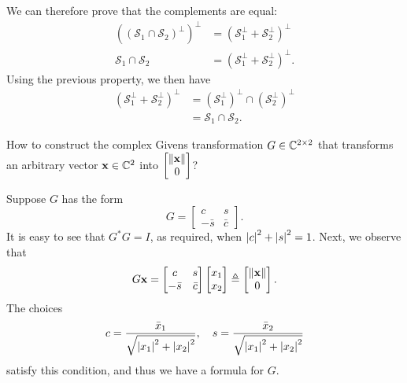 \begin{solution}
\begin{enumerate}
      We can therefore prove that the complements are equal:
      \begin{align*}
        ((\mathcal{S}_1 \cap \mathcal{S}_2)^\perp)^\perp
        & = (\mathcal{S}_1^\perp + \mathcal{S}_2^\perp)^\perp\\
        \mathcal{S}_1 \cap \mathcal{S}_2
        & = (\mathcal{S}_1^\perp + \mathcal{S}_2^\perp)^\perp.
      \end{align*}
      Using the previous property, we then have
      \begin{align*}
        (\mathcal{S}_1^\perp + \mathcal{S}_2^\perp)^\perp
        & = (\mathcal{S}_1^\perp)^\perp \cap (\mathcal{S}_2^\perp)^\perp\\
        & = \mathcal{S}_1 \cap \mathcal{S}_2.
      \end{align*}
  \end{enumerate}
\end{solution}

How to construct the complex Givens transformation \(G \in \mathbb{C}^{2 \times 2}\) that transforms an arbitrary vector \(\mathbf{x} \in \mathbb{C}^2\) into \(\begin{bmatrix}{\left\lVert\mathbf{x}\right\rVert} \\ 0\end{bmatrix}\)?

\begin{solution}
Suppose \(G\) has the form
\[
G = \begin{bmatrix} c & s \\ -\bar{s} & \bar{c} \end{bmatrix}.
\]
It is easy to see that \(G^*G = I\), as required, when \({\left\lvert c\right\lvert}^2 + {\left\lvert s\right\lvert}^2 = 1\).
Next, we observe that
\[
G\mathbf{x} = \begin{bmatrix} c & s \\ -\bar{s} & \bar{c} \end{bmatrix} \begin{bmatrix} x_1 \\ x_2 \end{bmatrix} \triangleq \begin{bmatrix} {\left\lVert\mathbf{x}\right\rVert} \\ 0 \end{bmatrix}.
\]
The choices
\[
c = \frac{\bar{x}_1}{\sqrt{{\left\lvert x_1\right\lvert}^2 + {\left\lvert x_2\right\lvert}^2}}, \quad s = \frac{\bar{x}_2}{\sqrt{{\left\lvert x_1\right\lvert}^2 + {\left\lvert x_2\right\lvert}^2}}
\]
satisfy this condition, and thus we have a formula for \(G\).
\end{solution}

